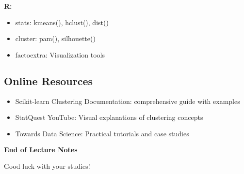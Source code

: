 \documentclass[
]{article}
\begin{document}
\textbf{R:}

\begin{itemize}
\item
  stats: kmeans(), hclust(), dist()
\item
  cluster: pam(), silhouette()
\item
  factoextra: Visualization tools
\end{itemize}

\textbf{ }

\subsection{Online Resources}

\begin{itemize}
\item
  Scikit-learn Clustering Documentation: comprehensive guide with
  examples
\item
  StatQuest YouTube: Visual explanations of clustering concepts
\item
  Towards Data Science: Practical tutorials and case studies
\end{itemize}

\textbf{End of Lecture Notes}

Good luck with your studies!
\end{document}
